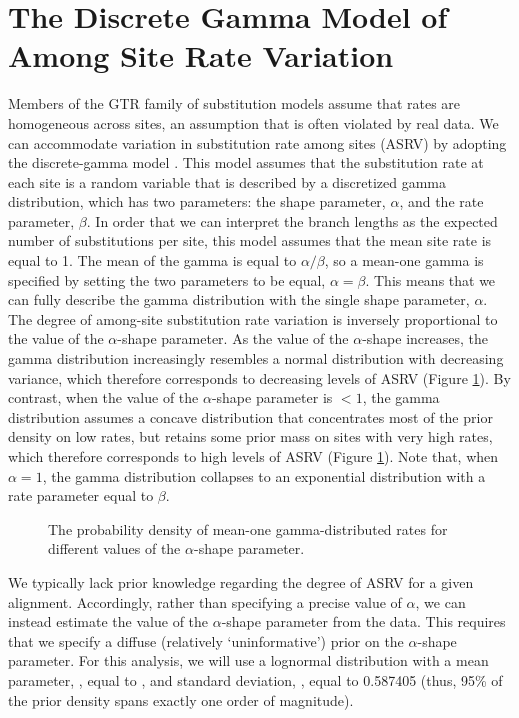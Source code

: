 \newpage
\section{The Discrete Gamma Model of Among Site Rate Variation}


Members of the GTR family of substitution models assume that rates are homogeneous across sites, an assumption that is often violated by real data.
We can accommodate variation in substitution rate among sites (ASRV) by adopting the discrete-gamma model \citep{Yang1994a}.
This model assumes that the substitution rate at each site is a random variable that is described by a discretized gamma distribution, which has two parameters: the shape parameter, $\alpha$, and the rate parameter, $\beta$. 
In order that we can interpret the branch lengths as the expected number of substitutions per site, this model assumes that the mean site rate is equal to 1.
The mean of the gamma is equal to $\alpha/\beta$, so a mean-one gamma is specified by setting the two parameters to be equal, $\alpha=\beta$.
This means that we can fully describe the gamma distribution with the single shape parameter, $\alpha$. 
The degree of among-site substitution rate variation is inversely proportional to the value of the $\alpha$-shape parameter.
As the value of the $\alpha$-shape increases, the gamma distribution increasingly resembles a normal distribution with decreasing variance, which therefore corresponds to decreasing levels of ASRV (Figure \ref{asrhGammaFig}).
By contrast, when the value of the $\alpha$-shape parameter is $< 1$, the gamma distribution assumes a concave distribution that concentrates most of the prior density on low rates, but retains some prior mass on sites with very high rates, which therefore corresponds to high levels of ASRV (Figure \ref{asrhGammaFig}).
Note that, when $\alpha = 1$, the gamma distribution collapses to an exponential distribution with a rate parameter equal to $\beta$.


\begin{figure}[h]
\centering
{}
\caption{\small The probability density of mean-one gamma-distributed rates for different values of the $\alpha$-shape parameter.}
\label{asrhGammaFig}
\end{figure}

We typically lack prior knowledge regarding the degree of ASRV for a given alignment.
Accordingly, rather than specifying a precise value of $\alpha$, we can instead estimate the value of the $\alpha$-shape parameter from the data.
This requires that we specify a diffuse (relatively `uninformative') prior on the $\alpha$-shape parameter.
For this analysis, we will use a lognormal distribution with a mean parameter, , equal to , and standard deviation, , equal to 0.587405 (thus, 95\% of the prior density spans exactly one order of magnitude).

